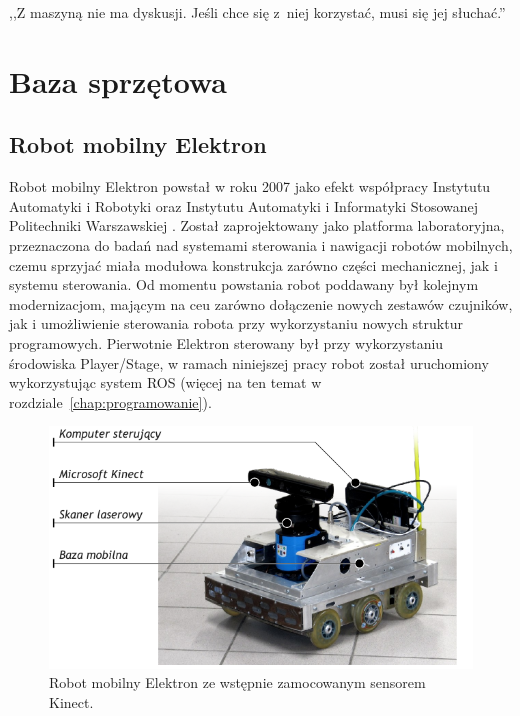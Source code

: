

\begin{savequote}[70mm]
,,Z maszyną nie ma dyskusji. Jeśli chce się z~niej korzystać, musi się jej słuchać.''
\end{savequote}


\chapter{Baza sprzętowa}
\label{chap:sprzet}


\section{Robot mobilny Elektron}

Robot mobilny Elektron powstał w roku 2007 jako efekt współpracy Instytutu Automatyki
i Robotyki oraz Instytutu Automatyki i Informatyki Stosowanej Politechniki Warszawskiej
\cite{SzynkiewiczEtal06}. Został zaprojektowany jako platforma laboratoryjna,
przeznaczona do badań nad systemami sterowania i nawigacji robotów mobilnych,
czemu sprzyjać miała modułowa konstrukcja zarówno części mechanicznej, jak i systemu
sterowania. Od momentu powstania robot poddawany był kolejnym modernizacjom,
mającym na ceu zarówno dołączenie nowych zestawów czujników, jak i umożliwienie
sterowania robota przy wykorzystaniu nowych struktur programowych. Pierwotnie Elektron
sterowany był przy wykorzystaniu środowiska Player/Stage, w ramach niniejszej pracy
robot został uruchomiony wykorzystując system ROS (więcej na ten temat w
rozdziale~\ref{chap:programowanie}).


\begin{figure}[h!]
\centering
\includegraphics{../../Common/img/elektron/elektron_desc}
\caption[Robot mobilny Elektron]{Robot mobilny Elektron ze wstępnie zamocowanym
sensorem Kinect.}
\label{fig:elektron}
\end{figure}

